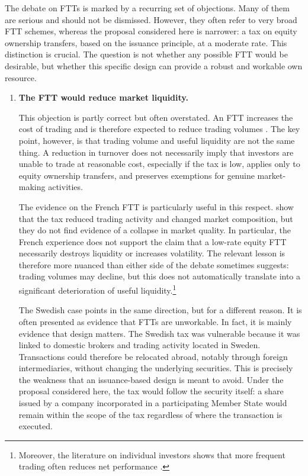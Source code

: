 \documentclass[../../main]{subfiles}
\begin{document}
The debate on FTTs is marked by a recurring set of objections. Many of them are serious and should not be dismissed. However, they often refer to very broad FTT schemes, whereas the proposal considered here is narrower: a tax on equity ownership transfers, based on the issuance principle, at a moderate rate. This distinction is crucial. The question is not whether any possible FTT would be desirable, but whether this specific design can provide a robust and workable own resource.


\begin{enumerate}

    \item \textbf{The FTT would reduce market liquidity.}

This objection is partly correct but often overstated. An FTT increases the cost of trading and is therefore expected to reduce trading volumes \citep{IMF2010}. The key point, however, is that trading volume and useful liquidity are not the same thing. A reduction in turnover does not necessarily imply that investors are unable to trade at reasonable cost, especially if the tax is low, applies only to equity ownership transfers, and preserves exemptions for genuine market-making activities.

The evidence on the French FTT is particularly useful in this respect. \cite{ColliardHoffmann2017} show that the tax reduced trading activity and changed market composition, but they do not find evidence of a collapse in market quality. In particular, the French experience does not support the claim that a low-rate equity FTT necessarily destroys liquidity or increases volatility. The relevant lesson is therefore more nuanced than either side of the debate sometimes suggests: trading volumes may decline, but this does not automatically translate into a significant deterioration of useful liquidity.\footnote{Moreover, the literature on individual investors  shows that more frequent trading often reduces net performance \citep{DeBondtThaler1995, Shleifer2000,Odean1999,BarberOdean2000, BarberOdean2001}.}

The Swedish case points in the same direction, but for a different reason. It is often presented as evidence that FTTs are unworkable. In fact, it is mainly evidence that design matters. The Swedish tax was vulnerable because it was linked to domestic brokers and trading activity located in Sweden. Transactions could therefore be relocated abroad, notably through foreign intermediaries, without changing the underlying securities. This is precisely the weakness that an issuance-based design is meant to avoid. Under the proposal considered here, the tax would follow the security itself: a share issued by a company incorporated in a participating Member State would remain within the scope of the tax regardless of where the transaction is executed.


\end{enumerate}
\end{document}
